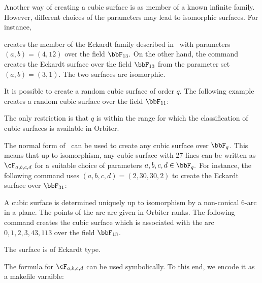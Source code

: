 \bigskip


Another way of creating a cubic surface is as member of a known infinite family.
However, different choices of the parameters may lead to isomorphic surfaces.
For instance, 


creates the member of the Eckardt family  
described in~\cite{BettenKaraoglu19a} 
with parameters $(a,b) = (4,12)$ over the field $\bbF_{13}.$
On the other hand, the command 
creates the Eckardt surface over the field $\bbF_{13}$ 
from the parameter set $(a,b) = (3,1).$
The two surfaces are isomorphic.


\bigskip



It is possible to create a random cubic surface of order $q$. The following example 
creates a random cubic surface over the field $\bbF_{11}$:


The only restriction is that $q$ is within the range 
for which the classification of cubic surfaces is available in Orbiter.

\bigskip

The normal form of~\cite{BettenKaraoglu22} 
can be used to create any cubic surface over $\bbF_q$.
This means that up to isomorphism, 
any cubic surface with 27 lines 
can be written as $\cF_{a,b,c,d}$ 
for a suitable choice of parameters $a,b,c,d \in \bbF_q.$
For instance, the following command uses $(a,b,c,d) = (2,30,30,2)$ 
to create the Eckardt surface over $\bbF_{31}$:




\bigskip



A cubic surface is determined uniquely up 
to isomorphism by a non-conical 6-arc in a plane. 
The points of the arc are given in Orbiter ranks.
The following command creates the cubic surface which is 
associated with the arc $0,1,2,3,43,113$ over the field 
$\bbF_{13}$.



The surface is of Eckardt type.

\bigskip


The formula for $\cF_{a,b,c,d}$ can be used symbolically. 
To this end, we encode it as a makefile varaible:


